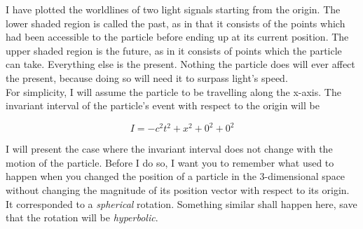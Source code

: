 \documentclass[12pt]{article}
\begin{document}
\begin{center}
\end{center}


I have plotted the worldlines of two light signals starting from the origin. The lower shaded region is called the past, as in that it consists of the points which 
had been accessible to the particle before ending up at its current position. The upper shaded region is the future, as in it consists of points which the particle can take. 
Everything else is the present. Nothing the particle does will ever affect the present, because doing so will need it to surpass light's speed. \\
For simplicity, I will assume the particle to be travelling along the x-axis. The invariant interval of the particle's event with respect to the origin will be 

\[I = -c^2t^2 + x^2 + 0^2 + 0^2\]

I will present the case where the invariant interval does not change with the motion of the particle.
Before I do so, I want you to remember what used to happen when you changed the position of a particle in the 3-dimensional space
without changing the magnitude of its position vector with respect to its origin. It corresponded to a \textit{spherical} rotation. 
Something similar shall happen here, save that the rotation will be \textit{hyperbolic}. \\
\end{document}
